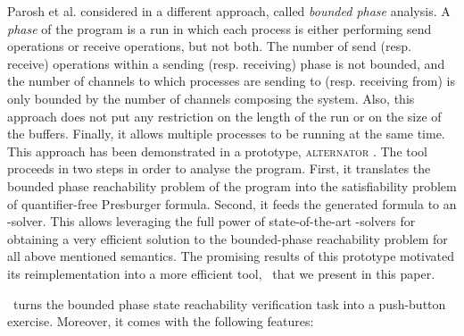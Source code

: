 Parosh et al. considered in \cite{AAC13} a different approach, called \textit{bounded phase} analysis.
%
A \textit{phase} of the program is a run in which each process 
is either performing send operations or receive operations, but not both.
%
The number of send (resp. receive) operations within a sending (resp. receiving) phase
is not bounded, and the number of channels to which processes are sending to (resp. receiving from)
is only bounded by the number of channels composing the system.
%
Also, this approach does not put any restriction on the length of the
run or on the size of the buffers.
%
Finally, it allows multiple processes to be running at the same time.
This approach has been demonstrated in a prototype, \textsc{alternator} \cite{github.alternator}.
The tool proceeds in two steps in order to analyse the program.
%
First, it translates the bounded phase reachability problem of the program into the satisfiability problem of quantifier-free Presburger formula.
Second, it feeds the generated formula to an \Smt-solver.
%
This allows leveraging the full power of state-of-the-art
\Smt-solvers for obtaining a very efficient solution to the bounded-phase reachability problem for all above mentioned semantics. 
%
%
The promising results of this prototype motivated its reimplementation into a more efficient tool, \MPass\, that we present in this paper.

\MPass\ turns the bounded phase state reachability verification task into a push-button exercise.
Moreover, it comes with the following features:


